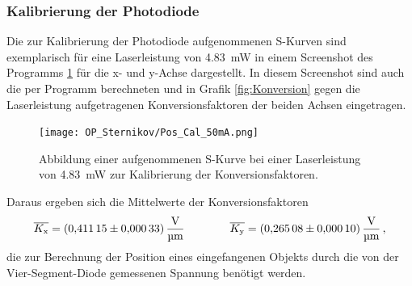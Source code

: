         \newpage
        \subsubsection{Kalibrierung der Photodiode}
            Die zur Kalibrierung der Photodiode aufgenommenen S-Kurven sind exemplarisch für eine Laserleistung von \SI{4.83}{\milli\watt} in einem Screenshot des Programms \ref{fig:pos_cal} für die x- und 
            y-Achse dargestellt. In diesem Screenshot sind auch die per Programm berechneten und in Grafik \ref{fig:Konversion} gegen die Laserleistung aufgetragenen Konversionsfaktoren der beiden Achsen 
            eingetragen.
            \FloatBarrier
            \begin{figure}[h]
            \centering
            \texttt{[image: OP\_Sternikov/Pos\_Cal\_50mA.png]}
            \caption{Abbildung einer aufgenommenen S-Kurve bei einer Laserleistung von \SI{4.83}{\milli\watt} zur Kalibrierung der Konversionsfaktoren.}
            \label{fig:pos_cal}
            \end{figure}
            \FloatBarrier
            \newpage
            Daraus ergeben sich die Mittelwerte der Konversionsfaktoren
            \begin{equation*}
                \overline{K_{\text{x}}} = \SI{0.41115 +- 0.00033}{\volt\per\micro\metre} \qquad\qquad \overline{K_{\text{y}}} = \SI{0.26508 +- 0.00010}{\volt\per\micro\metre} \,,
            \end{equation*}
            die zur Berechnung der Position eines eingefangenen Objekts durch die von der Vier-Segment-Diode gemessenen Spannung benötigt werden.

